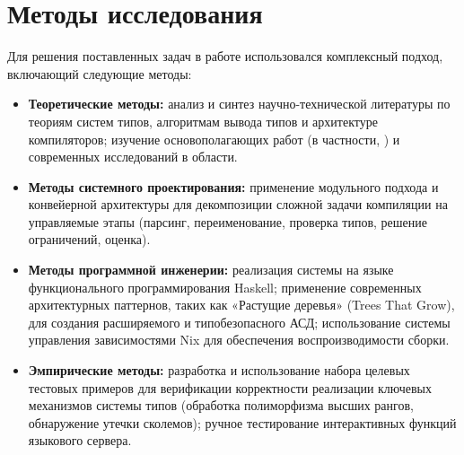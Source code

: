 \chapter{Методы исследования}
Для решения поставленных задач в работе использовался комплексный подход, включающий следующие методы:
\begin{itemize}
    \item \textbf{Теоретические методы:} анализ и синтез научно-технической литературы по теориям систем типов, алгоритмам вывода типов и архитектуре компиляторов; изучение основополагающих работ (в частности, \cite{jones-practical-2007}) и современных исследований в области.
    \item \textbf{Методы системного проектирования:} применение модульного подхода и конвейерной архитектуры для декомпозиции сложной задачи компиляции на управляемые этапы (парсинг, переименование, проверка типов, решение ограничений, оценка).
    \item \textbf{Методы программной инженерии:} реализация системы на языке функционального программирования Haskell; применение современных архитектурных паттернов, таких как «Растущие деревья» (Trees That Grow), для создания расширяемого и типобезопасного АСД; использование системы управления зависимостями Nix для обеспечения воспроизводимости сборки.
    \item \textbf{Эмпирические методы:} разработка и использование набора целевых тестовых примеров для верификации корректности реализации ключевых механизмов системы типов (обработка полиморфизма высших рангов, обнаружение утечки сколемов); ручное тестирование интерактивных функций языкового сервера.
\end{itemize}

